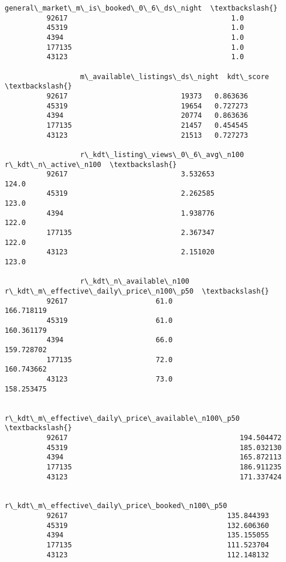 \documentclass[11pt]{article}
\begin{document}
\begin{Verbatim}[commandchars=\\\{\}]
                  general\_market\_m\_is\_booked\_0\_6\_ds\_night  \textbackslash{}
          92617                                       1.0   
          45319                                       1.0   
          4394                                        1.0   
          177135                                      1.0   
          43123                                       1.0   
          
                  m\_available\_listings\_ds\_night  kdt\_score  \textbackslash{}
          92617                           19373   0.863636   
          45319                           19654   0.727273   
          4394                            20774   0.863636   
          177135                          21457   0.454545   
          43123                           21513   0.727273   
          
                  r\_kdt\_listing\_views\_0\_6\_avg\_n100  r\_kdt\_n\_active\_n100  \textbackslash{}
          92617                           3.532653                124.0   
          45319                           2.262585                123.0   
          4394                            1.938776                122.0   
          177135                          2.367347                122.0   
          43123                           2.151020                123.0   
          
                  r\_kdt\_n\_available\_n100  r\_kdt\_m\_effective\_daily\_price\_n100\_p50  \textbackslash{}
          92617                     61.0                              166.718119   
          45319                     61.0                              160.361179   
          4394                      66.0                              159.728702   
          177135                    72.0                              160.743662   
          43123                     73.0                              158.253475   
          
                  r\_kdt\_m\_effective\_daily\_price\_available\_n100\_p50  \textbackslash{}
          92617                                         194.504472   
          45319                                         185.032130   
          4394                                          165.872113   
          177135                                        186.911235   
          43123                                         171.337424   
          
                  r\_kdt\_m\_effective\_daily\_price\_booked\_n100\_p50  
          92617                                      135.844393  
          45319                                      132.606360  
          4394                                       135.155055  
          177135                                     111.523704  
          43123                                      112.148132  
\end{Verbatim}
            
\end{document}
